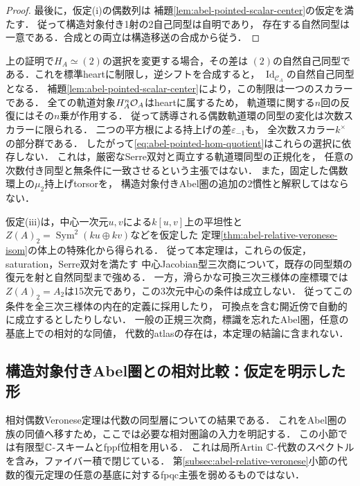 \begin{proof}
最後に，仮定\textup{(i)}の偶数列は
補題\ref{lem:abel-pointed-scalar-center}の仮定を満たす．
従って構造対象付き1射の2自己同型は自明であり，
存在する自然同型は一意である．合成との両立は構造移送の合成から従う．
\end{proof}

\begin{remark}[Serre同定の選択と次数スカラー]
\label{rem:abel-pointed-serre-normalization}
上の証明で$H_A\simeq(2)$の選択を変更する場合，その差は
$(2)$の自然自己同型である．これを標準heartに制限し，逆シフトを合成すると，
$\operatorname{Id}_{\mathcal C_A}$の自然自己同型となる．
補題\ref{lem:abel-pointed-scalar-center}により，この制限は一つのスカラーである．
全ての軌道対象$H_A^n\mathcal O_A$はheartに属するため，
軌道環に関する$n$回の反復にはその$n$乗が作用する．
従って誘導される偶数軌道環の同型の変化は次数スカラーに限られる．
二つの平方根による持上げの差$\varepsilon_{-1}$も，
全次数スカラー$k^\times$の部分群である．
したがって\eqref{eq:abel-pointed-hom-quotient}はこれらの選択に依存しない．
これは，厳密なSerre双対と両立する軌道環同型の正規化を，
任意の次数付き同型と無条件に一致させるという主張ではない．
また，固定した偶数環上の$\mu_2$持上げtorsorを，
構造対象付きAbel圏の追加の2慣性と解釈してはならない．
\end{remark}

\begin{remark}[中心二変数を持つ三次族への適用範囲]
\label{rem:abel-pointed-central-chart}
仮定\textup{(iii)}は，中心一次元$u,v$による$k[u,v]$上の平坦性と
$Z(A)_2=\operatorname{Sym}^2(ku\oplus kv)$などを仮定した
定理\ref{thm:abel-relative-veronese-isom}の体上の特殊化から得られる．
従って本定理は，これらの仮定，saturation，Serre双対を満たす
中心Jacobian型三次商について，既存の同型類の復元を射と自然同型まで強める．
一方，滑らかな可換三次三様体の座標環では
$Z(A)_2=A_2$は15次元であり，この3次元中心の条件は成立しない．
従ってこの条件を全三次三様体の内在的定義に採用したり，
可換点を含む開近傍で自動的に成立するとしたりしない．
一般の正規三次商，標識を忘れたAbel圏，任意の基底上での相対的な同値，
代数的atlasの存在は，本定理の結論に含まれない．
\end{remark}

\subsection{構造対象付きAbel圏との相対比較：仮定を明示した形}
\label{subsec:abel-relative-categorical-hom}

相対偶数Veronese定理は代数の同型層についての結果である．
これをAbel圏の族の同値へ移すため，ここでは必要な相対圏論の入力を明記する．
この小節では有限型$\mathbb C$-スキームとfppf位相を用いる．
これは局所Artin $\mathbb C$-代数のスペクトルを含み，ファイバー積で閉じている．
第\ref{subsec:abel-relative-veronese}小節の代数的復元定理の任意の基底に対するfpqc主張を弱めるものではない．

